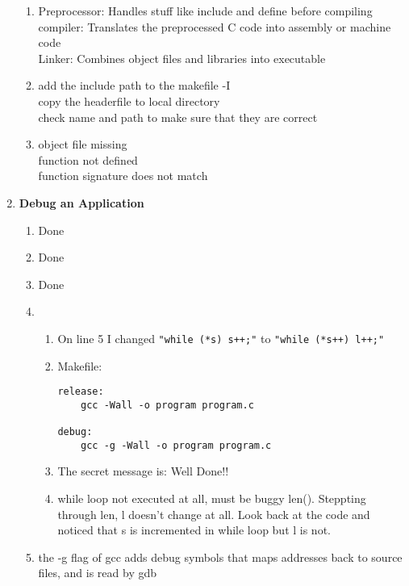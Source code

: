 \documentclass[12pt]{article}
\begin{document}
\begin{enumerate}
\begin{enumerate}[label=\arabic*)]
        \item Preprocessor: Handles stuff like include and define before compiling 
        \\compiler: Translates the preprocessed C code into assembly or machine code 
        \\Linker: Combines object files and libraries into executable

        \item add the include path to the makefile -I \\ copy the headerfile to local directory \\ check name and path to make sure that they are correct
        \item object file missing \\ function not defined \\ function signature does not match
    \end{enumerate}

    \item \textbf{Debug an Application}
    \begin{enumerate}[label=\arabic*)]
        \item Done
        \item Done
        \item Done
        \item \begin{enumerate}[label=\arabic*)]
        \item On line 5 I changed \texttt{"while (*s) s++;"} to \texttt{"while (*s++) l++;"}
        \item Makefile: \begin{verbatim}
release:
	gcc -Wall -o program program.c

debug:
	gcc -g -Wall -o program program.c
        \end{verbatim}
        \item The secret message is: Well Done!!
        \item while loop not executed at all, must be buggy len(). Steppting through len, l doesn't change at all. Look back at the code and noticed that s is incremented  in while loop but l is not. 
        \end{enumerate}
        \item the -g flag of gcc adds debug symbols that maps addresses back to source files, and is read by gdb

    \end{enumerate}

\end{enumerate}
\end{document}
